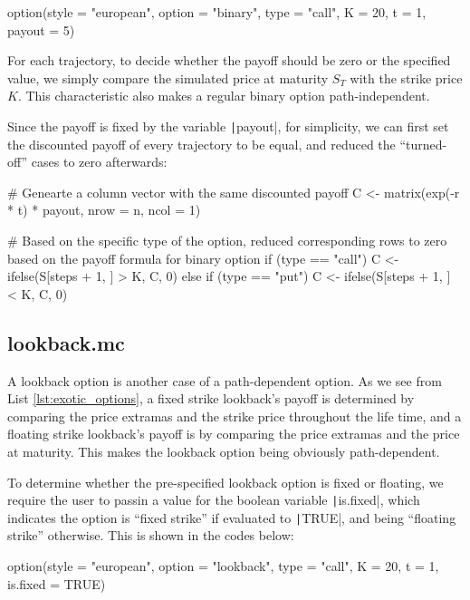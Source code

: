 \begin{Rminted}
option(style = "european", option = "binary", type = "call", K = 20, t = 1, payout = 5)
\end{Rminted}

For each trajectory, to decide whether the payoff should be zero or the specified value, we simply compare the simulated price at maturity $S_T$ with the strike price $K$. This characteristic also makes a regular binary option path-independent.

Since the payoff is fixed by the variable \texttt|payout|, for simplicity, we can first set the discounted payoff of every trajectory to be equal, and reduced the ``turned-off'' cases to zero afterwards:

\begin{Rminted}
# Genearte a column vector with the same discounted payoff
C <- matrix(exp(-r * t) * payout, nrow = n, ncol = 1)

# Based on the specific type of the option, reduced corresponding rows to zero based on the payoff formula for binary option
if (type == "call") {
    C <- ifelse(S[steps + 1, ] > K, C, 0)
} else if (type == "put") {
    C <- ifelse(S[steps + 1, ] < K, C, 0)
}
\end{Rminted}

\subsection{lookback.mc}

A lookback option is another case of a path-dependent option. As we see from List \ref{lst:exotic_options}, a fixed strike lookback's payoff is determined by comparing the price extramas and the strike price throughout the life time, and a floating strike lookback's payoff is by comparing the price extramas and the price at maturity. This makes the lookback option being obviously path-dependent.

To determine whether the pre-specified lookback option is fixed or floating, we require the user to passin a value for the boolean variable \texttt|is.fixed|, which indicates the option is ``fixed strike'' if evaluated to \texttt|TRUE|, and being ``floating strike'' otherwise. This is shown in the codes below:

\begin{Rminted}
option(style = "european", option = "lookback", type = "call", K = 20, t = 1, is.fixed = TRUE)
\end{Rminted}

